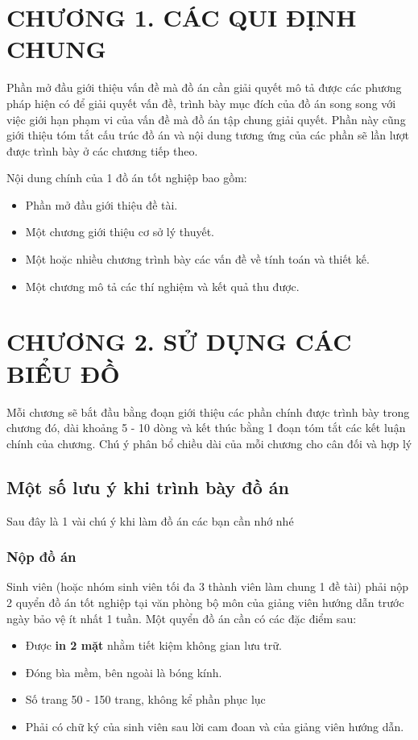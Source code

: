 \section*{\centering CHƯƠNG 1.	CÁC QUI ĐỊNH CHUNG}
\setcounter{section}{1}
\setcounter{subsection}{0}
\setcounter{figure}{0}
\setcounter{table}{0}
Phần mở đầu giới thiệu vấn đề mà đồ án cần giải quyết mô tả được các phương pháp hiện có để giải quyết vấn đề, trình bày mục đích của đồ án song song với việc giới hạn phạm vi của vấn đề mà đồ án tập chung giải quyết. Phần này cũng giới thiệu tóm tắt cấu trúc đồ án và nội dung tương ứng của các phần sẽ lần lượt được trình bày ở các chương tiếp theo.

Nội dung chính của 1 đồ án tốt nghiệp bao gồm:
\begin{itemize}
    \item Phần mở đầu giới thiệu đề tài.
    \item Một chương giới thiệu cơ sở lý thuyết.
    \item Một hoặc nhiều chương trình bày các vấn đề về tính toán và thiết kế.
    \item Một chương mô tả các thí nghiệm và kết quả thu được.
\end{itemize}


\cleardoublepage
{}\section*{\centering CHƯƠNG 2. SỬ DỤNG CÁC BIỂU ĐỒ}
\setcounter{section}{2}
\setcounter{subsection}{0}
\setcounter{figure}{0}
\setcounter{table}{0}
Mỗi chương sẽ bắt đầu bằng đoạn giới thiệu các phần chính được trình bày trong chương đó, dài khoảng 5 - 10 dòng và kết thúc bằng 1 đoạn tóm tắt các kết luận chính của chương. Chú ý phân bổ chiều dài của mỗi chương cho cân đối và hợp lý 
\subsection{Một số lưu ý khi trình bày đồ án}
Sau đây là 1 vài chú ý khi làm đồ án các bạn cần nhớ nhé
\subsubsection{Nộp đồ án}
Sinh viên (hoặc nhóm sinh viên tối đa 3 thành viên làm chung 1 đề tài) phải nộp 2 quyển đồ án tốt nghiệp tại văn phòng bộ môn của giảng viên hướng dẫn trước ngày bảo vệ ít nhất 1 tuần. Một quyển đồ án cần có các đặc điểm sau:
\begin{itemize}
    \item Được \textbf{in 2 mặt} nhằm tiết kiệm không gian lưu trữ.
    \item Đóng bìa mềm, bên ngoài là bóng kính. 
    \item Số trang 50 - 150 trang, không kể phần phục lục
    \item Phải có chữ ký của sinh viên sau lời cam đoan và của giảng viên hướng dẫn. 
\end{itemize}
